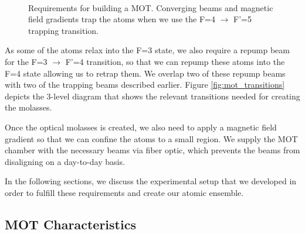 

\begin{figure}[!ht]
  \centering
   \\
   \caption[MOT illustration and transitions]{Requirements for building a MOT.   Converging beams and magnetic field gradients trap the atoms when we use the F=4 $\to$ F'=5 trapping transition.}
   \label{fig:mot_ill_trans}
\end{figure}

As some of the atoms relax into the F=3 state, we also require a repump beam for the F=3 $\to$ F'=4 transition, so that we can repump these atoms into the F=4 state allowing us to retrap them.  We overlap two of these repump beams with two of the trapping beams described earlier. Figure \ref{fig:mot_transitions} depicts the 3-level diagram that shows the relevant transitions needed for creating the molasses.   


Once the optical molasses is created, we also need to apply a magnetic field gradient so that we can confine the atoms to a small region.  We supply the MOT chamber with the necessary beams via fiber optic, which prevents the beams from disaligning on a day-to-day basis.

In the following sections, we discuss the experimental setup that we developed in order to fulfill these requirements and create our atomic ensemble.

\subsection{MOT Characteristics} 

